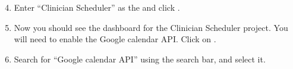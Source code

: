 \documentclass[letterpaper,10pt,english]{sphinxmanual}
\begin{document}
\begin{figure}[h!]
\centering
{}\end{figure}

\begin{DUlineblock}{0em}
\item[] 
\end{DUlineblock}
\begin{enumerate}
\setcounter{enumi}{3}
\item {} 
Enter “Clinician Scheduler” as the  and click .

\end{enumerate}

\begin{figure}[h!]
\centering
{}\end{figure}

\begin{DUlineblock}{0em}
\item[] 
\end{DUlineblock}
\begin{enumerate}
\setcounter{enumi}{4}
\item {} 
Now you should see the dashboard for the Clinician Scheduler project.
You will need to enable the Google calendar API. Click on .

\end{enumerate}

\begin{figure}[h!]
\centering
{}\end{figure}

\begin{DUlineblock}{0em}
\item[] 
\end{DUlineblock}
\begin{enumerate}
\setcounter{enumi}{5}
\item {} 
Search for “Google calendar API” using the search bar, and select it.

\end{enumerate}

\begin{figure}[h!]
\centering
{}\end{figure}
\end{document}
